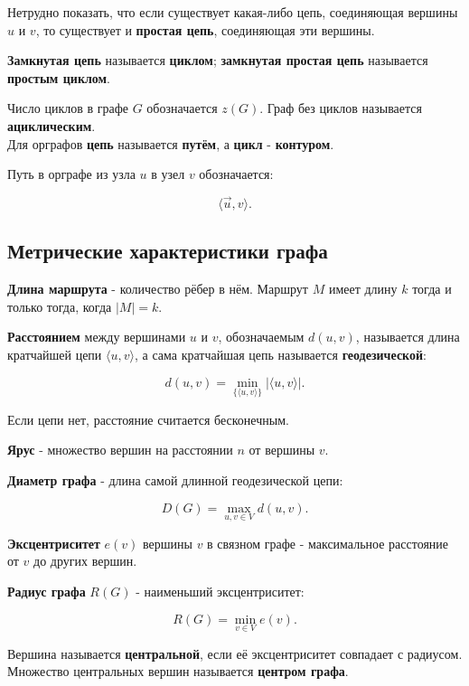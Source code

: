 {Нетрудно показать, что если существует какая-либо цепь, соединяющая вершины $u$ и $v$, то существует и \textbf{простая цепь}, соединяющая эти вершины.

\textbf{Замкнутая цепь} называется \textbf{циклом};  
\textbf{замкнутая простая цепь} называется \textbf{простым циклом}.

Число циклов в графе $G$ обозначается $z(G)$.  
Граф без циклов называется \textbf{ациклическим}. \\ 

Для орграфов \textbf{цепь} называется \textbf{путём}, а \textbf{цикл} - \textbf{контуром}.

Путь в орграфе из узла $u$ в узел $v$ обозначается:


\[
\langle \vec{u}, v \rangle.
\]

\subsection*{Метрические характеристики графа}

\textbf{Длина маршрута} - количество рёбер в нём.  
Маршрут $M$ имеет длину $k$ тогда и только тогда, когда $|M| = k$.

\textbf{Расстоянием} между вершинами $u$ и $v$, обозначаемым $d(u, v)$, называется длина кратчайшей цепи $\langle u, v \rangle$, а сама кратчайшая цепь называется \textbf{геодезической}:


\[
d(u, v) = \min_{\{\langle u, v \rangle\}} |\langle u, v \rangle|.
\]


Если цепи нет, расстояние считается бесконечным.

\textbf{Ярус} - множество вершин на расстоянии $n$ от вершины $v$.

\textbf{Диаметр графа} - длина самой длинной геодезической цепи:


\[
D(G) = \max_{u, v \in V} d(u, v).
\]



\textbf{Эксцентриситет} $e(v)$ вершины $v$ в связном графе - максимальное расстояние от $v$ до других вершин.

\textbf{Радиус графа} $R(G)$ - наименьший эксцентриситет:


\[
R(G) = \min_{v \in V} e(v).
\]



Вершина называется \textbf{центральной}, если её эксцентриситет совпадает с радиусом.  
Множество центральных вершин называется \textbf{центром графа}.



    \newpage
}
